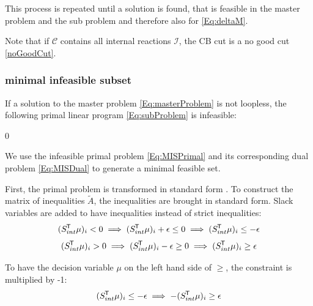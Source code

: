 This process is repeated until a solution is found, that is feasible in the master problem and the sub problem and therefore also for \cref{Eq:deltaM}.

Note that if $\mathcal{C}$ contains all internal reactions $\mathcal{I}$, the CB cut is a no good cut \cref{noGoodCut}.


\subsubsection*{minimal infeasible subset}
If a solution to the master problem \cref{Eq:masterProblem} is not loopless, the following primal linear program \cref{Eq:subProblem} is infeasible:
\begin{maxi!}
    {\scriptstyle \mu}{0}{\label{Eq:MISPrimal}}{} 
\end{maxi!}

We use the infeasible primal problem \cref{Eq:MISPrimal} and its corresponding dual problem \cref{Eq:MISDual} to generate a minimal feasible set. 

First, the primal problem is transformed in standard form .
To construct the matrix of inequalities $\widetilde{A}$, the inequalities are brought in standard form. Slack variables are added to have inequalities instead of strict inequalities: 
\begin{equation*}
    (S_{int} ^{\mkern-1.5mu\mathsf{T}} \mu)_i < 0 \implies (S_{int} ^{\mkern-1.5mu\mathsf{T}} \mu)_i + \epsilon \leq 0 \implies (S_{int} ^{\mkern-1.5mu\mathsf{T}} \mu)_i \leq - \epsilon \\
\end{equation*}
\begin{equation*}
    (S_{int} ^{\mkern-1.5mu\mathsf{T}} \mu)_i > 0 \implies (S_{int} ^{\mkern-1.5mu\mathsf{T}} \mu)_i - \epsilon \geq 0  \implies (S_{int} ^{\mkern-1.5mu\mathsf{T}} \mu)_i \geq \epsilon
\end{equation*}

To have the decision variable $\mu$ on the left hand side of $\geq$, the constraint is multiplied by -1:
\begin{equation*}
    (S_{int} ^{\mkern-1.5mu\mathsf{T}} \mu)_i \leq - \epsilon \implies - (S_{int} ^{\mkern-1.5mu\mathsf{T}} \mu)_i \geq \epsilon
\end{equation*}

